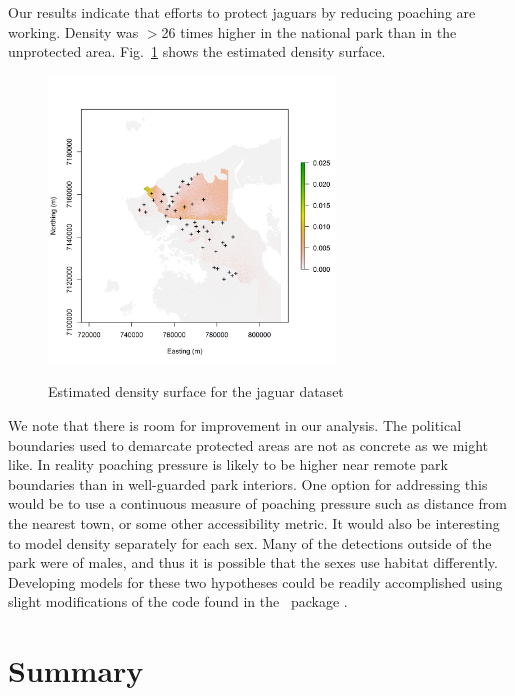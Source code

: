 Our results
indicate that efforts to protect jaguars by reducing poaching are
working. Density was $>$26 times higher in the national park than in the
unprotected area. Fig.~\ref{ch9:fig:Dsurface} shows the estimated
density surface.

\begin{figure}
\centering
\includegraphics[width=3in,height=3in]{Ch11/figs/Dsurface34}
\label{ch9:fig:Dsurface}
\caption{Estimated density surface for the jaguar dataset}
\end{figure}


We note that there is room for improvement in our analysis. The
political boundaries used to demarcate protected areas are not as
concrete as we might like. In reality poaching pressure is likely to
be higher near remote park boundaries than in well-guarded park
interiors. One option
for addressing this would be to use a continuous measure of poaching
pressure such as distance from the nearest town, or some other
accessibility metric. It would also be interesting to model density
separately for each sex. Many of the detections outside of the park
were of males, and thus it is possible that the sexes use habitat
differently. Developing models for these two hypotheses could be
readily accomplished using slight modifications of the code found in
the \R~package \scrbook.



\section{Summary}

